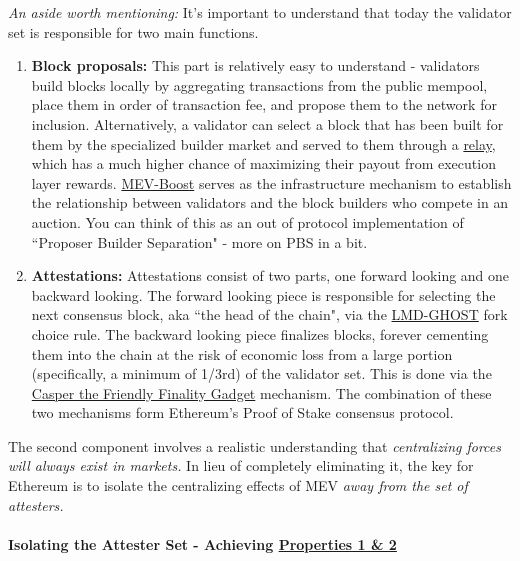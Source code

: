 \documentclass[12pt]{article}
\newcommand{\subsubsubsection}[1]{%
  \paragraph{#1}\mbox{}\par
}
\newenvironment{aside}
  {\begin{mdframed}[style=0,%
      backgroundcolor=fgcolor!5!\thepagecolor,  %
      fontcolor=fgcolor,     %
      leftline=false,rightline=false,leftmargin=2em,rightmargin=2em,%
      innerleftmargin=0pt,innerrightmargin=0pt,linewidth=0.75pt,%
      skipabove=7pt,skipbelow=7pt]\footnotesize}
  {\end{mdframed}}
\begin{document}
\begin{aside}
   \textit{An aside worth mentioning:} It's important to understand that today the validator set is responsible for two main functions. 
   
   \begin{enumerate}
       \item \textbf{Block proposals:} This part is relatively easy to understand - validators build blocks locally by aggregating transactions from the public mempool, place them in order of transaction fee, and propose them to the network for inclusion. Alternatively, a validator can select a block that has been built for them by the specialized builder market and served to them through a \href{https://beaconcha.in/relays#t7d}{relay}, which has a much higher chance of maximizing their payout from execution layer rewards. \href{https://docs.flashbots.net/flashbots-mev-boost/introduction#:~:text=%E2%80%8B,from%20a%20marketplace%20of%20builders.}{MEV-Boost} serves as the infrastructure mechanism to establish the relationship between validators and the block builders who compete in an auction. You can think of this as an out of protocol implementation of ``Proposer Builder Separation" - more on PBS in a bit. 
       \item \textbf{Attestations:} Attestations consist of two parts, one forward looking and one backward looking. The forward looking piece is responsible for selecting the next consensus block, aka ``the head of the chain", via the \href{https://eth2book.info/capella/part2/consensus/lmd_ghost/}{LMD-GHOST} fork choice rule. The backward looking piece finalizes blocks, forever cementing them into the chain at the risk of economic loss from a large portion (specifically, a minimum of 1/3rd) of the validator set. This is done via the  \href{https://eth2book.info/capella/part2/consensus/casper_ffg/}{Casper the Friendly Finality Gadget} mechanism. The combination of these two mechanisms form Ethereum's Proof of Stake consensus protocol. 
   \end{enumerate}

\end{aside}

The second component involves a realistic understanding that \textit{centralizing forces will always exist in markets.} In lieu of completely eliminating it, the key for Ethereum is to isolate the centralizing effects of MEV \textit{away from the set of attesters.} 

\subsubsubsection{Isolating the Attester Set - Achieving \hyperref[Properties]{Properties 1 \& 2}}
\end{document}
